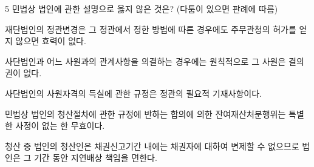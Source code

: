 \begin{question}{5}
민법상 법인에 관한 설명으로 옳지 않은 것은? (다툼이 있으면 판례에 따름)
\begin{choices}
  \item 재단법인의 정관변경은 그 정관에서 정한 방법에 따른 경우에도 주무관청의 허가를 얻지 않으면 효력이 없다.
  \item 사단법인과 어느 사원과의 관계사항을 의결하는 경우에는 원칙적으로 그 사원은 결의권이 없다.
  \item 사단법인의 사원자격의 득실에 관한 규정은 정관의 필요적 기재사항이다.
  \item 민법상 법인의 청산절차에 관한 규정에 반하는 합의에 의한 잔여재산처분행위는 특별한 사정이 없는 한 무효이다.
  \item 청산 중 법인의 청산인은 채권신고기간 내에는 채권자에 대하여 변제할 수 없으므로 법인은 그 기간 동안 지연배상 책임을 면한다.
\end{choices}
\end{question}
